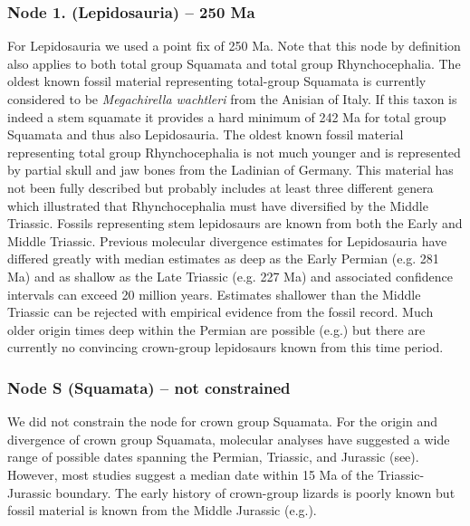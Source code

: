 \documentclass[a4paper, 12pt]{article}
\begin{document}
\subsubsection*{Node 1. (Lepidosauria) – 250 Ma}
For Lepidosauria we used a point fix of 250 Ma. Note that this node by definition also applies to both total group Squamata and total group Rhynchocephalia\cite{evans2003feet}. The oldest known fossil material representing total-group Squamata is currently considered to be \textit{Megachirella wachtleri} from the Anisian of Italy\cite{renesto2003new,simoes2018origin}. If this taxon is indeed a stem squamate it provides a hard minimum of 242 Ma for total group Squamata and thus also Lepidosauria. The oldest known fossil material representing total group Rhynchocephalia is not much younger and is represented by partial skull and jaw bones from the Ladinian of Germany\cite{jones2013integration,schoch2018tetrapod}. This material has not been fully described but probably includes at least three different genera which illustrated that Rhynchocephalia must have diversified by the Middle Triassic. Fossils representing stem lepidosaurs are known from both the Early and Middle Triassic\cite{evans2009small,schoch2018tetrapod}. Previous molecular divergence estimates for Lepidosauria have differed greatly\cite{jones2013integration} with median estimates as deep as the Early Permian (e.g. 281 Ma) and as shallow as the Late Triassic (e.g. 227 Ma) and associated confidence intervals can exceed 20 million years. Estimates shallower than the Middle Triassic can be rejected with empirical evidence from the fossil record\cite{jones2013integration,simoes2018origin}. Much older origin times deep within the Permian are possible (e.g.\cite{simoes2018origin}) but there are currently no convincing crown-group lepidosaurs known from this time period.  

\subsubsection*{Node S (Squamata) – not constrained}
We did not constrain the node for crown group Squamata. For the origin and divergence of crown group Squamata, molecular analyses have suggested a wide range of possible dates spanning the Permian, Triassic, and Jurassic (see\cite{jones2013integration}). However, most studies suggest a median date within 15 Ma of the Triassic-Jurassic boundary\cite{jones2013integration,simoes2018origin,burbrink2020interrogating}. The early history of crown-group lizards is poorly known but fossil material is known from the Middle Jurassic (e.g.\cite{evans1998crown,evans2003feet,evans2008skull}). 
\end{document}
